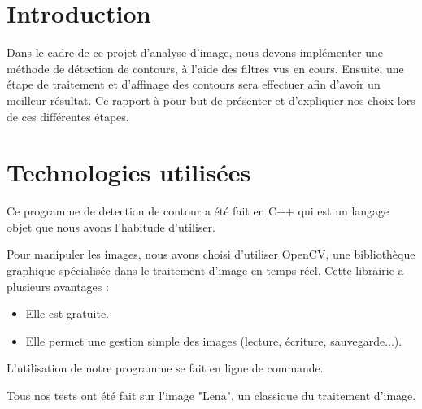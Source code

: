 \documentclass[11pt]{article}
\author{\fontsize{14}{14}{Aurélien CHEMIER 10908892 et Romane LHOMME 11006689}}
\title{\fontsize{16}{16}{{\bf Analyse, aquisition et traitement d’image \\ TP1}}}
\date{\fontsize{11}{11}{\today}}
\begin{document}
\thispagestyle{empty}
\maketitle

\newpage
\tableofcontents
\newpage

\section{Introduction}

	Dans le cadre de ce projet d’analyse d’image, nous devons implémenter une méthode de détection de contours, à l’aide des filtres vus en cours. 
	Ensuite, une étape de traitement et d'affinage des contours  sera effectuer afin d'avoir un meilleur résultat.
	Ce rapport à pour but de présenter et d'expliquer nos choix lors de ces différentes étapes.

	\section{Technologies utilisées}

	Ce programme de detection de contour a été fait en C++ qui est un langage objet que nous avons l'habitude d'utiliser.

	Pour manipuler les images, nous avons choisi d'utiliser OpenCV, une bibliothèque graphique spécialisée dans le traitement d'image en temps réel.
	Cette librairie a plusieurs avantages :
	\begin{itemize}
		\item Elle est gratuite.
		\item Elle permet une gestion simple des images (lecture, écriture, sauvegarde...).
	\end{itemize}

	L'utilisation de notre programme se fait en ligne de commande.

	Tous nos tests ont été fait sur l'image "Lena", un classique du traitement d'image.
\end{document}
